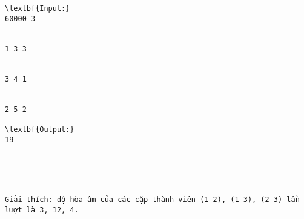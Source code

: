 \begin{verbatim}
\textbf{Input:}
60000 3


1 3 3


3 4 1


2 5 2

\textbf{Output:}
19





Giải thích: độ hòa âm của các cặp thành viên (1-2), (1-3), (2-3) lần lượt là 3, 12, 4. \end{verbatim}